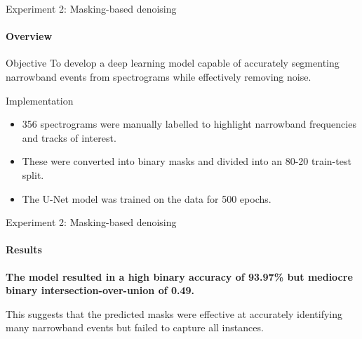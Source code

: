 \documentclass[]{beamer}
\begin{document}
\begin{frame}{Experiment 2: Masking-based denoising}
    \framesubtitle{Overview}
    
    \begin{alertblock}{Objective}
    To develop a deep learning model capable of accurately segmenting narrowband events from spectrograms while effectively removing noise.
    \end{alertblock}

    \begin{block}{Implementation}
        \begin{itemize}
            \item 356 spectrograms were manually labelled to highlight narrowband frequencies and tracks of interest.
            \item These were converted into binary masks and divided into an 80-20 train-test split.
            \item The U-Net model was trained on the data for 500 epochs.
        \end{itemize}
    \end{block}
\end{frame}

    

\begin{frame}{Experiment 2: Masking-based denoising}
    \framesubtitle{Results}

    \textbf{The model resulted in a high binary accuracy of 93.97\% but mediocre binary intersection-over-union of 0.49.}
    
    \vspace{1em}
    
    This suggests that the predicted masks were effective at accurately identifying many narrowband events but failed to capture all instances.
\end{frame}
\end{document}
